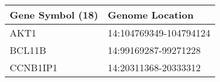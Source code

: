 \begin{tabular}{ll}
\toprule
Gene Symbol (18) &        Genome Location \\
\midrule
            AKT1 & 14:104769349-104794124 \\
          BCL11B &   14:99169287-99271228 \\
        CCNB1IP1 &   14:20311368-20333312 \\
\bottomrule
\end{tabular}
